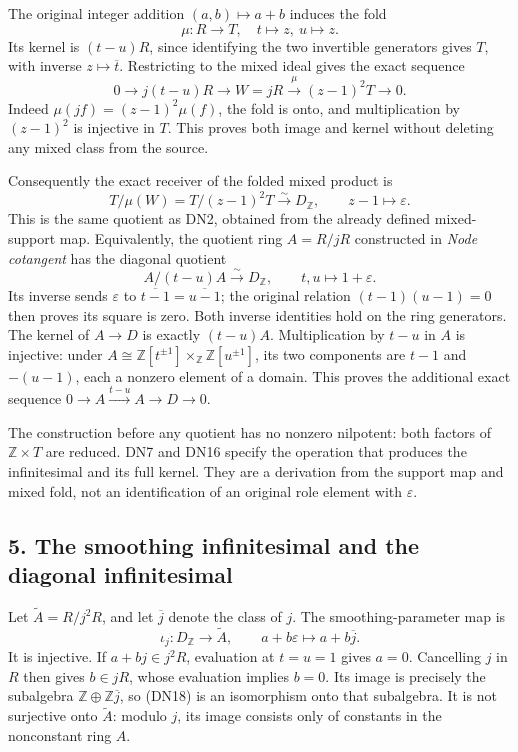\documentclass[
]{article}
\begin{document}
The original integer addition \((a,b)\mapsto a+b\) induces the fold \[
\mu:R\longrightarrow T,\quad t\mapsto z,\ u\mapsto z.
\tag{DN14}
\] Its kernel is \((t-u)R\), since identifying the two invertible
generators gives \(T\), with inverse \(z\mapsto\overline t\).
Restricting to the mixed ideal gives the exact sequence \[
0\longrightarrow j(t-u)R\longrightarrow W=jR
\xrightarrow{\mu}(z-1)^2T\longrightarrow0.
\tag{DN15}
\] Indeed \(\mu(jf)=(z-1)^2\mu(f)\), the fold is onto, and
multiplication by \((z-1)^2\) is injective in \(T\). This proves both
image and kernel without deleting any mixed class from the source.

Consequently the exact receiver of the folded mixed product is \[
T/\mu(W)=T/(z-1)^2T\xrightarrow{\sim}D_{\mathbb Z},
\qquad z-1\longmapsto\varepsilon.
\tag{DN16}
\] This is the same quotient as DN2, obtained from the already defined
mixed-support map. Equivalently, the quotient ring \(A=R/jR\)
constructed in \emph{Node cotangent} has the diagonal quotient \[
A/(t-u)A\xrightarrow{\sim}D_{\mathbb Z},
\qquad t,u\longmapsto1+\varepsilon.
\tag{DN17}
\] Its inverse sends \(\varepsilon\) to
\(\overline{t-1}=\overline{u-1}\); the original relation
\((t-1)(u-1)=0\) then proves its square is zero. Both inverse identities
hold on the ring generators. The kernel of \(A\to D\) is exactly
\((t-u)A\). Multiplication by \(t-u\) in \(A\) is injective: under
\(A\cong\mathbb Z[t^{\pm1}]\times_{\mathbb Z}\mathbb Z[u^{\pm1}]\), its
two components are \(t-1\) and \(-(u-1)\), each a nonzero element of a
domain. This proves the additional exact sequence
\(0\to A\xrightarrow{t-u}A\to D\to0\).

The construction before any quotient has no nonzero nilpotent: both
factors of \(\mathbb Z\times T\) are reduced. DN7 and DN16 specify the
operation that produces the infinitesimal and its full kernel. They are
a derivation from the support map and mixed fold, not an identification
of an original role element with \(\varepsilon\).

\subsection{5. The smoothing infinitesimal and the diagonal
infinitesimal}\label{the-smoothing-infinitesimal-and-the-diagonal-infinitesimal}

Let \(\widetilde A=R/j^2R\), and let \(\overline j\) denote the class of
\(j\). The smoothing-parameter map is \[
\iota_j:D_{\mathbb Z}\longrightarrow\widetilde A,
\qquad a+b\varepsilon\longmapsto a+b\overline j.
\tag{DN18}
\] It is injective. If \(a+bj\in j^2R\), evaluation at \(t=u=1\) gives
\(a=0\). Cancelling \(j\) in \(R\) then gives \(b\in jR\), whose
evaluation implies \(b=0\). Its image is precisely the subalgebra
\(\mathbb Z\oplus\mathbb Z\overline j\), so (DN18) is an isomorphism
onto that subalgebra. It is not surjective onto \(\widetilde A\): modulo
\(j\), its image consists only of constants in the nonconstant ring
\(A\).
\end{document}
